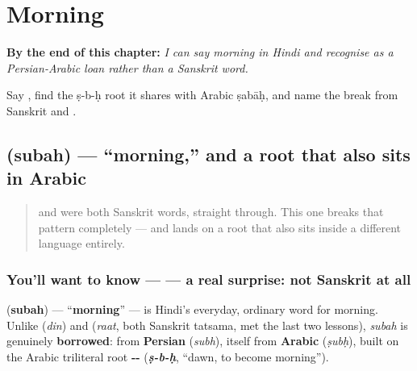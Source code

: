 
\chapter{Morning}
\label{ch:hi-morning}

\begin{chapteropening}
\textbf{By the end of this chapter:} \emph{I can say morning in Hindi and recognise  as a Persian-Arabic loan rather than a Sanskrit word.}

Say , find the ṣ-b-ḥ root it shares with Arabic ṣabāḥ, and name the break from Sanskrit  and .
\end{chapteropening}

\section[\texorpdfstring{\hi{सुबह} (subah)}{सुबह (subah)}]{ (subah) — \textquotedblleft{}morning,\textquotedblright{} and a root that also sits in Arabic}

\label{lesson:HI-C28-subah}



\begin{quote}
 and  were both Sanskrit words, straight through. This one breaks that pattern completely — and lands on a root that also sits inside a different language entirely.
\end{quote}

\subsection*{You'll want to know —  — a real surprise: not Sanskrit at all}
\textbf{} (\textbf{subah}) — \textquotedblleft{}\textbf{morning}\textquotedblright{} — is Hindi's everyday, ordinary word for morning. Unlike \textbf{} (\emph{din}) and \textbf{} (\emph{raat}, both Sanskrit tatsama, met the last two lessons), \emph{subah} is genuinely \textbf{borrowed}: from \textbf{Persian} \textbf{} (\emph{subh}), itself from \textbf{Arabic} \textbf{} (\emph{ṣubḥ}), built on the Arabic triliteral root \textbf{--} (\emph{\textbf{ṣ-b-ḥ}}, \textquotedblleft{}dawn, to become morning\textquotedblright{}).

